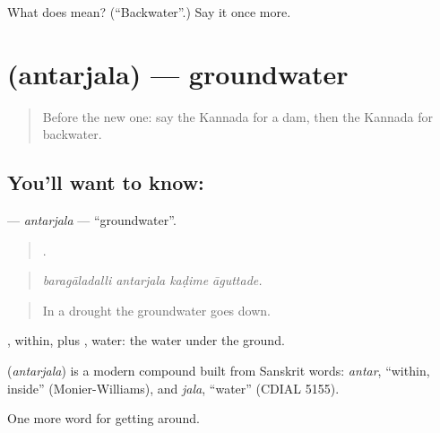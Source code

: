 \begin{tcolorbox}[breakable,colback=teal!4,colframe=teal!35!black,title={Before you move on}]
What does  mean? (\textquotedblleft{}Backwater\textquotedblright{}.) Say it once more.
\end{tcolorbox}
\section[\texorpdfstring{\kn{ಅಂತರ್ಜಲ} (antarjala)}{ಅಂತರ್ಜಲ (antarjala)}]{ (antarjala) — groundwater}

\label{lesson:KA-C483-antarjala}



\begin{quote}
Before the new one: say the Kannada for a dam, then the Kannada for backwater.
\end{quote}

\subsection*{You'll want to know: }
\textbf{} — \emph{antarjala} — \textquotedblleft{}groundwater\textquotedblright{}.

\begin{quote}
   .
\end{quote}

\begin{quote}
\emph{baragāladalli antarjala kaḍime āguttade.}
\end{quote}

\begin{quote}
In a drought the groundwater goes down.
\end{quote}

, within, plus , water: the water under the ground.

\begin{cousinweb}
\textbf{} (\emph{antarjala}) is a modern compound built from Sanskrit words: \emph{antar}, \textquotedblleft{}within, inside\textquotedblright{} (Monier-Williams), and \emph{jala}, \textquotedblleft{}water\textquotedblright{} (CDIAL 5155).
\end{cousinweb}

\begin{grammarlens}[title={What you've built}]
One more word for getting around.
\end{grammarlens}

